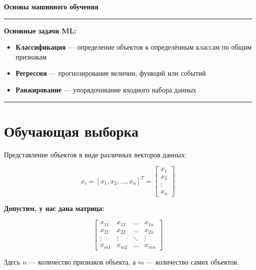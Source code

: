 \documentclass[12pt]{article}
\begin{document}
\begin{center}
    \LARGE \textbf{Основы машинного обучения}
\end{center}

\vspace{1em}
\noindent\rule{\linewidth}{0.4pt}

\vspace{1em}
\textbf{Основные задачи ML:}
\begin{itemize}
    \item \textbf{Классификация} — определение объектов к определённым классам по общим признакам
    \item \textbf{Регрессия} — прогнозирование величин, функций или событий
    \item \textbf{Ранжирование} — упорядочивание входного набора данных
\end{itemize}

\vspace{1em}
\noindent\rule{\linewidth}{0.4pt}

\section*{Обучающая выборка}

Представление объектов в виде различных векторов данных:

\[
x_i = [x_1, x_2, \ldots, x_n]^T =
\begin{bmatrix}
x_1 \\
x_2 \\
\vdots \\
x_n
\end{bmatrix}
\]

\textbf{Допустим, у нас дана матрица:}

\[
\begin{bmatrix}
x_{11} & x_{12} & \ldots & x_{1n} \\
x_{21} & x_{22} & \ldots & x_{2n} \\
\vdots & \vdots & \ddots & \vdots \\
x_{m1} & x_{m2} & \ldots & x_{mn}
\end{bmatrix}
\]

Здесь \( n \) — количество признаков объекта, а \( m \) — количество самих объектов.
\end{document}
